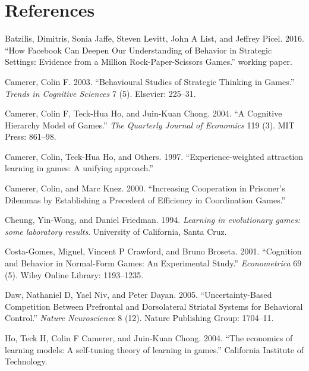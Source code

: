 \documentclass[smallextended]{svjour3}       %
\begin{document}
\hypertarget{references}{%
\section*{References}\label{references}}

\hypertarget{refs}{}
\leavevmode\hypertarget{ref-batzilis}{}%
Batzilis, Dimitris, Sonia Jaffe, Steven Levitt, John A List, and Jeffrey
Picel. 2016. ``How Facebook Can Deepen Our Understanding of Behavior in
Strategic Settings: Evidence from a Million Rock-Paper-Scissors Games.''
working paper.

\leavevmode\hypertarget{ref-camerer2003behavioural}{}%
Camerer, Colin F. 2003. ``Behavioural Studies of Strategic Thinking in
Games.'' \emph{Trends in Cognitive Sciences} 7 (5). Elsevier: 225--31.

\leavevmode\hypertarget{ref-camerer2004cognitive}{}%
Camerer, Colin F, Teck-Hua Ho, and Juin-Kuan Chong. 2004. ``A Cognitive
Hierarchy Model of Games.'' \emph{The Quarterly Journal of Economics}
119 (3). MIT Press: 861--98.

\leavevmode\hypertarget{ref-camerer1997experience}{}%
Camerer, Colin, Teck-Hua Ho, and Others. 1997. ``Experience-weighted
attraction learning in games: A unifying approach.''

\leavevmode\hypertarget{ref-knez2000}{}%
Camerer, Colin, and Marc Knez. 2000. ``Increasing Cooperation in
Prisoner's Dilemmas by Establishing a Precedent of Efficiency in
Coordination Games.''

\leavevmode\hypertarget{ref-cheung1994learning}{}%
Cheung, Yin-Wong, and Daniel Friedman. 1994. \emph{Learning in
evolutionary games: some laboratory results}. University of California,
Santa Cruz.

\leavevmode\hypertarget{ref-costa2001cognition}{}%
Costa-Gomes, Miguel, Vincent P Crawford, and Bruno Broseta. 2001.
``Cognition and Behavior in Normal-Form Games: An Experimental Study.''
\emph{Econometrica} 69 (5). Wiley Online Library: 1193--1235.

\leavevmode\hypertarget{ref-daw2005uncertainty}{}%
Daw, Nathaniel D, Yael Niv, and Peter Dayan. 2005. ``Uncertainty-Based
Competition Between Prefrontal and Dorsolateral Striatal Systems for
Behavioral Control.'' \emph{Nature Neuroscience} 8 (12). Nature
Publishing Group: 1704--11.

\leavevmode\hypertarget{ref-ho2004economics}{}%
Ho, Teck H, Colin F Camerer, and Juin-Kuan Chong. 2004. ``The economics
of learning models: A self-tuning theory of learning in games.''
California Institute of Technology.
\end{document}
